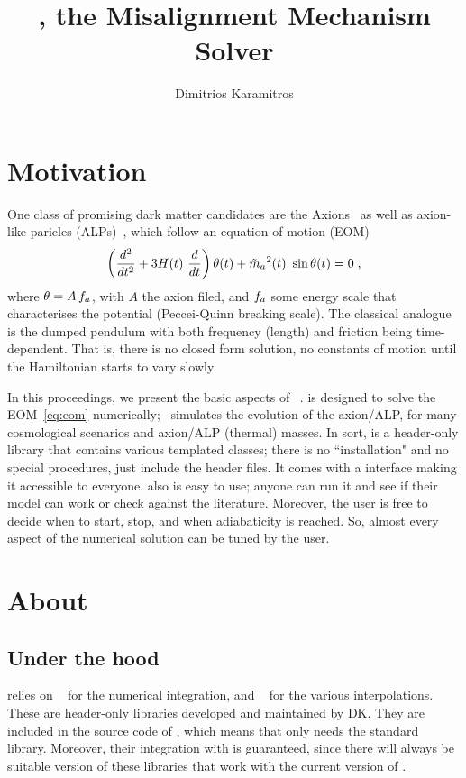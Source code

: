 \documentclass[a4paper,11pt]{article}
\title{\mimes, the Misalignment Mechanism Solver}
\author{Dimitrios Karamitros}
\affiliation{School of Physics and Astronomy, The University of Manchester,\\ Manchester M13 9PL,
	United Kingdom}
\begin{document}
\maketitle


\section{Motivation}
	One class of promising dark matter candidates are the Axions~\cite{Peccei:1977hh,Weinberg:1977ma,Wilczek:1977pj,Preskill:1982cy,Dine:1982ah,Abbott:1982af,Berezhiani:1989fp,Berezhiani:1992rk,Sakharov:1994id,Sakharov:1996xg,Khlopov:1999tm} as well as axion-like paricles (ALPs)~\cite{Chikashige:1980ui,Georgi:1981pu,Ringwald:2014vqa}, which follow an equation of motion (EOM)
	\begin{equation}
		\left( \dfrac{d^2}{d t^2} + 3 H(t) \ \dfrac{d}{d t}  \right) \theta(t) + \tilde m_{a}{}^2(t) \ \sin \theta(t) = 0 \; ,
		\label{eq:eom}
	\end{equation}	
	where $\theta= A \, f_{a}{}$, with $A$ the axion filed, and $f_{a}{}$ some energy scale that characterises the potential (Peccei-Quinn breaking scale). 
	The classical analogue is the dumped pendulum with both frequency (length) and friction being time-dependent. That is, there is no closed form solution, 
	no constants of motion until the Hamiltonian starts to vary slowly. 
	
	
	In this proceedings, we present the basic aspects of \mimes~\cite{Karamitros:2021nxi}. \mimes is designed to solve the EOM~\ref{eq:eom} numerically; \ie~\mimes simulates the evolution of the axion/ALP, for many cosmological scenarios and axion/ALP (thermal) masses. In sort, \mimes is a \CPP header-only library that contains various templated classes; there is no ``installation" and no special procedures, just include the header files. It comes with a \PY interface making it accessible to everyone. \mimes also is easy to use; anyone can run it and see if their model can work or check against the literature. Moreover, the user is 
	free to decide when to start, stop, and when adiabaticity is reached. So, almost every aspect of the numerical solution can be tuned by the user.	

	

\section{About \mimes}
	\subsection{Under the hood}
	\mimes relies on ~\cite{NaBBODES} for the numerical integration, and ~\cite{SimpleSplines} for the various interpolations. 
	These are header-only libraries developed and maintained by DK. They are included in the source code of \mimes, which means that \mimes only needs the standard \CPP library.
	Moreover, their integration with \mimes is guaranteed, since there will always be suitable version of these libraries that work with the current version of   \mimes.
	
\end{document}
